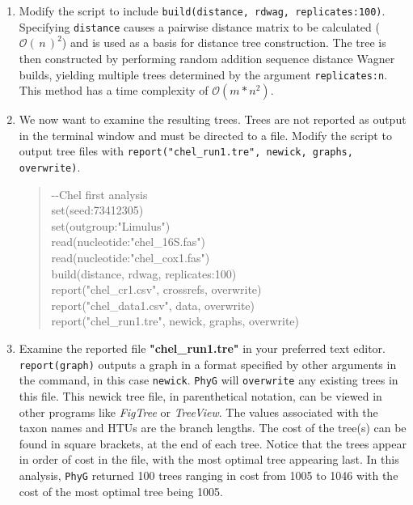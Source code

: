 \documentclass[11pt]{article}
\newcommand{\phyg}{\texttt{PhyG} }
\newcommand{\BigO}[1]{\ensuremath{\mathcal{O}\left(\,#1\,\right)}\xspace}
\begin{document}
\begin{enumerate}

\item Modify the script to include \texttt{build(distance, rdwag, replicates:100)}. 
Specifying \texttt{distance} causes a pairwise distance matrix to be calculated 
($\BigO n^2$) and is used as a basis for distance tree construction. The tree is 
then constructed by performing random addition sequence distance Wagner 
builds, yielding multiple trees determined by the argument \texttt{replicates:n}. 
This method has a time complexity of $\mathcal{O} \left( m*n^2 \right)$.

\item We now want to examine the resulting trees. Trees are not reported as 
output in the terminal window and must be directed to a file. Modify the script 
to output tree files with \texttt{report("chel\_run1.tre", newick, graphs, overwrite)}.

	\begin{quote}
	-\/-Chel first analysis\\
	set(seed:73412305)\\
	set(outgroup:"Limulus")\\
	read(nucleotide:"chel\_16S.fas")\\
	read(nucleotide:"chel\_cox1.fas")\\
	build(distance, rdwag, replicates:100)\\
	report("chel\_cr1.csv", crossrefs, overwrite)\\
	report("chel\_data1.csv", data, overwrite)\\
	report("chel\_run1.tre", newick, graphs, overwrite)\\
	\end{quote}
	
\item Examine the reported file \textbf{"chel\_run1.tre"} in your preferred text editor. 
\texttt{report(graph)} outputs a graph in a format specified by other arguments in the 
command, in this case \texttt{newick}. \phyg will \texttt{overwrite} any existing trees in 
this file. This newick tree file, in parenthetical notation, can be viewed in other programs 
like \textit{FigTree} or \textit{TreeView}. The values associated with the taxon names and 
HTUs are the branch lengths. The cost of the tree(s) can be found in square brackets, at 
the end of each tree. Notice that the trees appear in order of cost in the file, with the most 
optimal tree appearing last. In this analysis, \phyg returned 100 trees ranging in cost from 
1005 to 1046 with the cost of the most optimal tree being 1005.

\end{enumerate}
\end{document}

